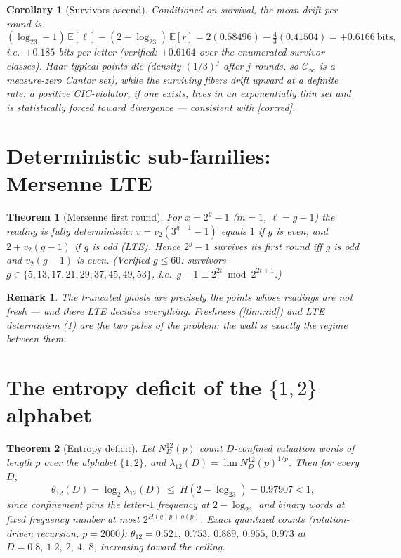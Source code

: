 \documentclass[11pt]{article}
\newtheorem{theorem}{Theorem}
\newtheorem{corollary}{Corollary}
\newtheorem*{remark}{Remark}
\newcommand{\vt}{v_2}
\begin{document}
\begin{corollary}[Survivors ascend]\label{cor:ascend}
Conditioned on survival, the mean drift per round is
\[
(\log_23-1)\,\mathbb E[\ell]-(2-\log_23)\,\mathbb E[r]
=2(0.58496)-\tfrac43(0.41504)=+0.6166\ \text{bits},
\]
i.e.\ $+0.185$ bits per letter (verified: $+0.6164$ over the
enumerated survivor classes). Haar-typical points die (density
$(1/3)^j$ after $j$ rounds, so $\mathcal C_\infty$ is a measure-zero
Cantor set), while the surviving fibers drift upward at a definite
rate: a positive CIC-violator, if one exists, lives in an exponentially
thin set \emph{and} is statistically forced toward divergence ---
consistent with \cref{cor:red}.
\end{corollary}

\section{Deterministic sub-families: Mersenne LTE}

\begin{theorem}[Mersenne first round]\label{thm:mersenne}
For $x=2^g-1$ ($m=1$, $\ell=g-1$) the reading is fully deterministic:
$v=\vt(3^{g-1}-1)$ equals $1$ if $g$ is even, and $2+\vt(g-1)$ if $g$
is odd (LTE). Hence $2^g-1$ survives its first round iff $g$ is odd
and $\vt(g-1)$ is even. (Verified $g\le60$: survivors
$g\in\{5,13,17,21,29,37,45,49,53\}$, i.e.\
$g-1\equiv2^{2t}\bmod2^{2t+1}$.)
\end{theorem}

\begin{remark}
The truncated ghosts are precisely the points whose readings are
\emph{not} fresh --- and there LTE decides everything. Freshness
(\cref{thm:iid}) and LTE determinism (\cref{thm:mersenne}) are the two
poles of the problem: the wall is exactly the regime between them.
\end{remark}

\section{The entropy deficit of the $\{1,2\}$ alphabet}

\begin{theorem}[Entropy deficit]\label{thm:deficit}
Let $N^{12}_D(p)$ count $D$-confined valuation words of length $p$
over the alphabet $\{1,2\}$, and
$\lambda_{12}(D)=\lim N^{12}_D(p)^{1/p}$. Then for \emph{every} $D$,
\[
\theta_{12}(D)=\log_2\lambda_{12}(D)\ \le\ H(2-\log_23)=0.97907<1 ,
\]
since confinement pins the letter-$1$ frequency at $2-\log_23$ and
binary words at fixed frequency number at most
$2^{H(q)p+o(p)}$. Exact quantized counts (rotation-driven recursion,
$p=2000$): $\theta_{12}=0.521,\ 0.753,\ 0.889,\ 0.955,\ 0.973$ at
$D=0.8,\ 1.2,\ 2,\ 4,\ 8$, increasing toward the ceiling.
\end{theorem}
\end{document}
